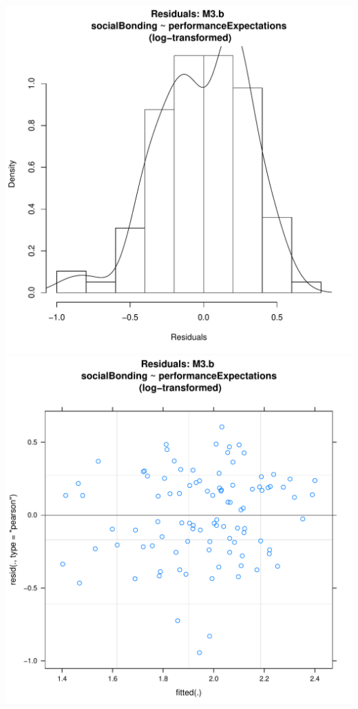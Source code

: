 \documentclass[12pt]{report}
\begin{document}
\newpage
\centering
\includegraphics[scale =.4]{../images/MLM3bLogHist.pdf}
\includegraphics[scale =.4]{../images/MLM3bLogScatter.pdf}
\end{document}
